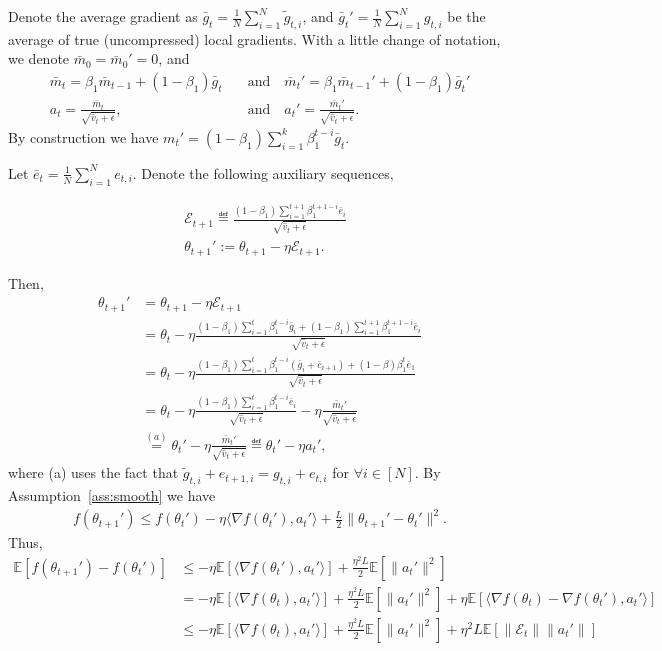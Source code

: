 \documentclass[11pt]{article}
\begin{document}
Denote the average gradient as $\bar g_t=\frac{1}{N}\sum_{i=1}^N \tilde g_{t,i}$, and $\bar g_t'=\frac{1}{N}\sum_{i=1}^N g_{t,i}$ be the average of true (uncompressed) local gradients. With a little change of notation, we denote $\bar m_0=\bar m_0'=0$, and
\begin{align*}
\bar m_t=\beta_1 \bar m_{t-1}+(1-\beta_1)\bar g_t \quad & \textrm{and} \quad \bar m_t'=\beta_1 \bar m_{t-1}'+(1-\beta_1) \bar g_t'\\
    a_t=\frac{\bar m_t}{\sqrt{\hat v_t+\epsilon}},\quad & \textrm{and} \quad  a_t'=\frac{\bar m_t'}{\sqrt{\hat v_t+\epsilon}}.
\end{align*}
By construction we have $m_t'=(1-\beta_1)\sum_{i=1}^k\beta_1^{t-i} \bar g_t$. 

Let $\bar e_t=\frac{1}{N}\sum_{i=1}^N e_{t,i}$. Denote the following auxiliary sequences,

\begin{align*}
& \mathcal E_{t+1}\eqdef \frac{(1-\beta_1)\sum_{i=1}^{t+1} \beta_1^{t+1-i} \bar e_i}{\sqrt{\hat v_t+\epsilon}}\\
&\theta_{t+1}':=\theta_{t+1}-\eta\mathcal E_{t+1}.
\end{align*}

Then, 
\begin{align*}
    \theta_{t+1}'&=\theta_{t+1}-\eta\mathcal E_{t+1}\\
    &=\theta_t-\eta\frac{(1-\beta_1)\sum_{i=1}^{t} \beta_1^{t-i}\bar g_i+(1-\beta_1)\sum_{i=1}^{t+1} \beta_1^{t+1-i}\bar e_i}{\sqrt{\hat v_t+\epsilon}}\\
    &=\theta_t-\eta\frac{(1-\beta_1)\sum_{i=1}^{t} \beta_1^{t-i}(\bar g_i+\bar e_{i+1})+(1-\beta)\beta_1^t \bar e_1}{\sqrt{\hat v_t+\epsilon}}\\
    &=\theta_t-\eta\frac{(1-\beta_1)\sum_{i=1}^{t} \beta_1^{t-i} \bar e_i}{\sqrt{\hat v_t+\epsilon}}-\eta\frac{\bar m_t'}{\sqrt{\hat v_t+\epsilon}}\\
    &\overset{(a)}{=}\theta_t'-\eta\frac{\bar m_t'}{\sqrt{\hat v_t+\epsilon}}\eqdef \theta_t'-\eta a_t',
\end{align*}
where (a) uses the fact that $\tilde g_{t,i}+e_{t+1,i}=g_{t,i}+e_{t,i}$ for $\forall i\in [N]$. By Assumption~\ref{ass:smooth} we have
\begin{align*}
    f(\theta_{t+1}')\leq f(\theta_t')-\eta\langle \nabla f(\theta_t'), a_t'\rangle+\frac{L}{2}\| \theta_{t+1}'-\theta_t'\|^2.
\end{align*}
Thus,
\begin{align}
    \mathbb E[f(\theta_{t+1}')-f(\theta_t')]&\leq -\eta\mathbb E[\langle \nabla f(\theta_t'), a_t'\rangle]+\frac{\eta^2L}{2}\mathbb E[\|a_t'\|^2]\\
    &=-\eta\mathbb E[\langle \nabla f(\theta_t), a_t'\rangle]+\frac{\eta^2L}{2}\mathbb E[\|a_t'\|^2]+\eta\mathbb E[\langle \nabla f(\theta_t)-\nabla f(\theta_t'),a_t'\rangle]\\
    &\leq -\eta\mathbb E[\langle \nabla f(\theta_t), a_t'\rangle]+\frac{\eta^2L}{2}\mathbb E[\|a_t'\|^2]+\eta^2 L\mathbb E[\| \mathcal E_t\| \|a_t'\|] \label{eq0}
\end{align}
\end{document}
